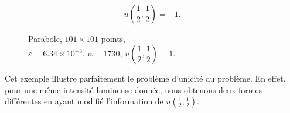 \begin{figure}[!htb]
    \begin{minipage}[t]{0.48\textwidth}
        \centering
        \caption{Parabole, $101\times101 $ points,\\[0.8ex] \centering$\varepsilon=6.34 \times 10^{-3}$, $n=1730$, $u\left( 
            \dfrac{1}{2},\dfrac{1}{2} \right)=1$.}\label{Fig:parabole}
    \end{minipage}\hfill
    \begin{minipage}[t]{0.48\textwidth}
        \centering
        \vspace{0.9em}

        \centering
        \\[0.5em]
        \[
            u\left( \dfrac{1}{2},\dfrac{1}{2}\right) = -1.
        \]\label{Fig:reverse_parabole}
    \end{minipage}
\end{figure}
\newpage
Cet exemple illustre parfaitement le problème d'unicité du problème. En effet, pour une même intensité lumineuse donnée, nous obtenons deux formes différentes en ayant modifié l'information de $u\left(\frac{1}{2},\frac{1}{2} \right)$.

